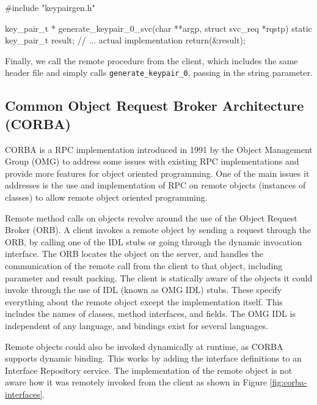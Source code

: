 \begin{code}
#include "keypairgen.h"

key_pair_t *
generate_keypair_0_svc(char **argp, struct svc_req *rqstp)
{
  static key_pair_t  result;
  // ... actual implementation
  return(&result);
}
\end{code}

Finally, we call the remote procedure from the client, which includes the same header file and simply calls \lstinline+generate_keypair_0+, passing in the string parameter.



\subsection{Common Object Request Broker Architecture (CORBA)} %
\label{sub:corba_intro}

CORBA is a RPC implementation introduced in 1991 by the Object Management Group (OMG) to address some issues with existing RPC implementations and provide more features for object oriented programming. One of the main issues it addresses is the use and implementation of RPC on remote objects (instances of classes) to allow remote object oriented programming. 

Remote method calls on objects revolve around the use of the Object Request Broker (ORB)\cite{isocorba}. A client invokes a remote object by sending a request through the ORB, by calling one of the IDL stubs or going through the dynamic invocation interface. The ORB locates the object on the server, and handles the communication of the remote call from the client to that object, including parameter and result packing. The client is statically aware of the objects it could invoke through the use of IDL (known as OMG IDL) stubs. These specify everything about the remote object except the implementation itself. This includes the names of classes, method interfaces, and fields. The OMG IDL is independent of any language, and bindings exist for several languages. 

Remote objects could also be invoked dynamically at runtime, as CORBA supports dynamic binding. This works by adding the interface definitions to an Interface Repository service. The implementation of the remote object is not aware how it was remotely invoked from the client as shown in Figure \ref{fig:corba-interfaces}.

